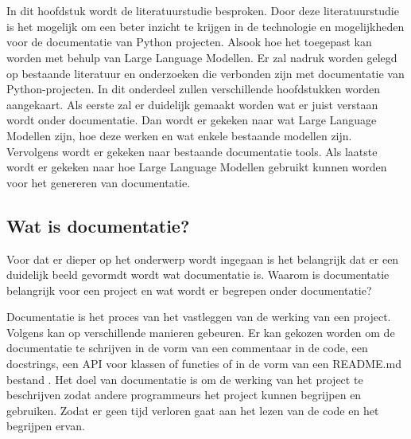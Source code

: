 \chapter{}%
\label{ch:stand-van-zaken}



In dit hoofdstuk wordt de literatuurstudie besproken. Door deze literatuurstudie is het mogelijk om een beter inzicht te krijgen in de technologie en mogelijkheden voor de documentatie van Python projecten. 
Alsook hoe het toegepast kan worden met behulp van Large Language Modellen. Er
zal nadruk worden gelegd op bestaande literatuur en onderzoeken die verbonden
zijn met documentatie van Python-projecten. In dit onderdeel zullen verschillende hoofdstukken worden aangekaart. 
Als eerste zal er duidelijk gemaakt worden wat er juist verstaan wordt onder documentatie. 
Dan wordt er gekeken naar wat Large Language Modellen zijn, hoe deze werken en wat enkele bestaande modellen zijn.
Vervolgens wordt er gekeken naar bestaande documentatie tools.
Als laatste wordt er gekeken naar hoe Large Language Modellen gebruikt kunnen worden voor het genereren van documentatie.

\section{Wat is documentatie?}
\label{sec:wat-is-documentatie}

Voor dat er dieper op het onderwerp wordt ingegaan is het belangrijk dat er een duidelijk beeld gevormdt wordt wat documentatie is. 
Waarom is documentatie belangrijk voor een project en wat wordt er begrepen onder documentatie? 

Documentatie is het proces van het vastleggen van de werking van een project.
Volgens \textcite{CodeQuality2024} kan op verschillende manieren gebeuren. 
Er kan gekozen worden om de documentatie te schrijven in de vorm van een commentaar in de code, een docstrings, een API voor klassen of functies of in de vorm van een README.md bestand \autocite{CodeQuality2024}.
Het doel van documentatie is om de werking van het project te beschrijven zodat andere programmeurs het project kunnen begrijpen en gebruiken.
Zodat er geen tijd verloren gaat aan het lezen van de code en het begrijpen ervan.

